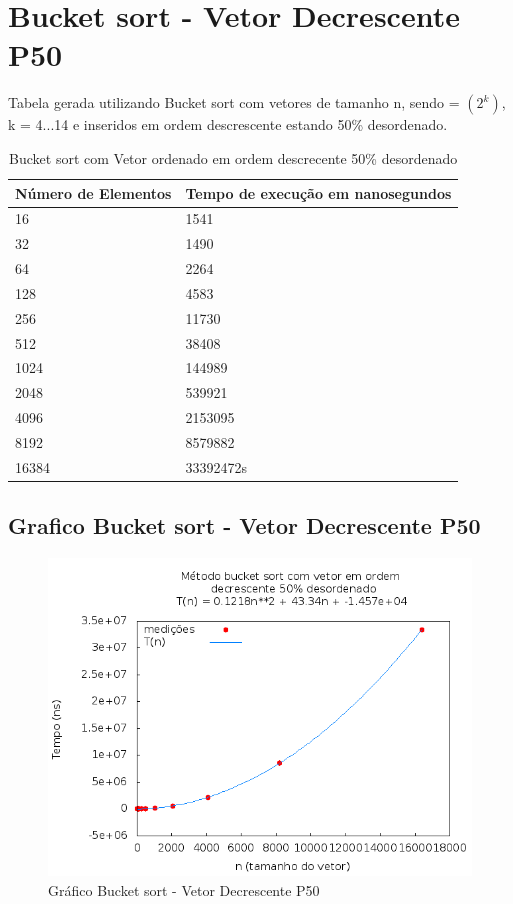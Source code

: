 \documentclass[12pt,a4paper,twoside]{report}
\begin{document}
\section{Bucket sort - Vetor Decrescente P50}
Tabela gerada utilizando Bucket sort com vetores de tamanho n, sendo = $(2^k)$, k = 4...14 e inseridos em ordem descrescente estando 50\% desordenado.

\begin{table}[H]
\centering
\caption{Bucket sort com Vetor ordenado em ordem descrecente 50\% desordenado}
\label{my-label}
\begin{tabular}{|l|l|}
\hline
\multicolumn{1}{|c|}{\textbf{Número de Elementos}} & \multicolumn{1}{c|}{\textbf{Tempo de execução em nanosegundos}} \\ \hline
16 & 1541 \\ \hline
32 & 1490 \\ \hline
64 & 2264 \\ \hline
128 & 4583 \\ \hline
256 & 11730 \\ \hline
512 & 38408 \\ \hline
1024 & 144989 \\ \hline
2048 & 539921 \\ \hline
4096 & 2153095 \\ \hline
8192 & 8579882 \\ \hline
16384 & 33392472s \\ \hline
\end{tabular}
\end{table}

\subsection{Grafico Bucket sort - Vetor Decrescente P50}
\begin{figure}[H]
    \centering
    \includegraphics[width=0.7\linewidth]{graficos/Bucket/vIntDecrescenteP50/vIntDecrescenteP50.png}
  \caption{Gráfico Bucket sort - Vetor Decrescente P50}
\end{figure}
\end{document}
